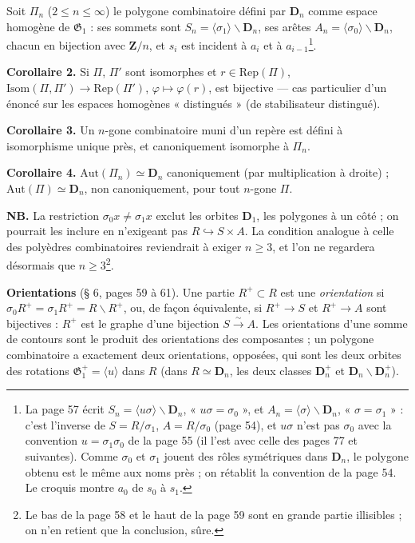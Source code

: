 \documentclass[11pt,a4paper]{article}
\begin{document}
Soit $\Pi_n$ ($2 \leq n \leq \infty$) le polygone combinatoire défini par
$\mathbf{D}_n$ comme espace homogène de $\mathfrak{G}_1$ : ses sommets sont
$S_n = \langle \sigma_1 \rangle \backslash \mathbf{D}_n$, ses arêtes $A_n =
\langle \sigma_0 \rangle \backslash \mathbf{D}_n$, chacun en bijection avec
$\mathbf{Z}/n$, et $s_i$ est incident à $a_i$ et à $a_{i-1}$\footnote{La
page 57 écrit $S_n = \langle u\sigma \rangle \backslash \mathbf{D}_n$, « $u\sigma
= \sigma_0$ », et $A_n = \langle \sigma \rangle \backslash \mathbf{D}_n$,
« $\sigma = \sigma_1$ » : c'est l'inverse de $S = R/\sigma_1$, $A =
R/\sigma_0$ (page 54), et $u\sigma$ n'est pas $\sigma_0$ avec la convention
$u = \sigma_1\sigma_0$ de la page 55 (il l'est avec celle des pages 77 et
suivantes). Comme $\sigma_0$ et $\sigma_1$ jouent des rôles symétriques dans
$\mathbf{D}_n$, le polygone obtenu est le même aux noms près ; on rétablit la
convention de la page 54. Le croquis montre $a_0$ de $s_0$ à $s_1$.}.

\textbf{Corollaire 2.} Si $\Pi$, $\Pi'$ sont isomorphes et $r \in
\mathrm{Rep}(\Pi)$, $\mathrm{Isom}(\Pi, \Pi') \to \mathrm{Rep}(\Pi')$,
$\varphi \mapsto \varphi(r)$, est bijective --- cas particulier d'un énoncé sur
les espaces homogènes « distingués » (de stabilisateur distingué).

\textbf{Corollaire 3.} Un $n$-gone combinatoire muni d'un repère est défini à
isomorphisme unique près, et canoniquement isomorphe à $\Pi_n$.

\textbf{Corollaire 4.} $\mathrm{Aut}(\Pi_n) \simeq \mathbf{D}_n$
canoniquement (par multiplication à droite) ; $\mathrm{Aut}(\Pi) \simeq
\mathbf{D}_n$, non canoniquement, pour tout $n$-gone $\Pi$.

\textbf{NB.} La restriction $\sigma_0 x \neq \sigma_1 x$ exclut les orbites
$\mathbf{D}_1$, les polygones à un côté ; on pourrait les inclure en
n'exigeant pas $R \hookrightarrow S \times A$. La condition analogue à celle
des polyèdres combinatoires reviendrait à exiger $n \geq 3$, et l'on ne
regardera désormais que $n \geq 3$\footnote{Le bas de la page 58 et le haut de
la page 59 sont en grande partie illisibles ; on n'en retient que la
conclusion, sûre.}.

\textbf{Orientations} (§ 6, pages 59 à 61). Une partie $R^{+} \subset R$ est
une \emph{orientation} si $\sigma_0 R^{+} = \sigma_1 R^{+} = R \smallsetminus
R^{+}$, ou, de façon équivalente, si $R^{+} \to S$ et $R^{+} \to A$ sont
bijectives : $R^{+}$ est le graphe d'une bijection $S \xrightarrow{\sim} A$.
Les orientations d'une somme de contours sont le produit des orientations des
composantes ; un polygone combinatoire a exactement deux orientations,
opposées, qui sont les deux orbites des rotations $\mathfrak{G}_1^{+} =
\langle u \rangle$ dans $R$ (dans $R \simeq \mathbf{D}_n$, les deux classes
$\mathbf{D}_n^{+}$ et $\mathbf{D}_n \smallsetminus \mathbf{D}_n^{+}$).
\end{document}
